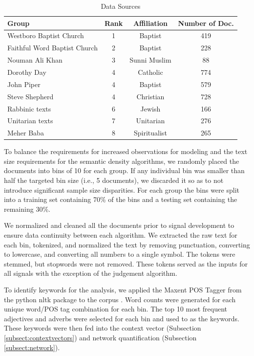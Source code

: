 \documentclass[11pt, a4paper]{article}
\begin{document}
\begin{table}[ht]
\caption{Data Sources}
\begin{center}
\begin{tabular}{lccc}
 \\  \hline
Group & Rank & Affiliation & Number of Doc.  \\ \hline
Westboro Baptist Church 		& 1 & Baptist		& 419 \\
Faithful Word Baptist Church	& 2 & Baptist		& 228 \\
Nouman Ali Khan			& 3 & Sunni Muslim	& 88 \\
Dorothy Day				& 4 & Catholic		& 774 \\
John Piper				& 4 & Baptist		& 579 \\
Steve Shepherd			& 4 & Christian		& 728 \\
Rabbinic texts				& 6 & Jewish		& 166 \\
Unitarian texts				& 7 & Unitarian		& 276 \\ 
Meher Baba				& 8 & Spiritualist	& 265 \\	

\end{tabular}
\end{center}
\label{table:data}
\end{table}

To balance the requirements for increased observations for modeling and the text size requirements for the semantic density algorithms, we randomly placed the documents into bins of 10 for each group. If any individual bin was smaller than half the targeted bin size (i.e., 5 documents), we discarded it so as to not introduce significant sample size disparities. For each group the bins were split into a training set containing 70\% of the bins and a testing set containing the remaining 30\%. 

We normalized and cleaned all the documents prior to signal development to ensure data continuity between each algorithm. We extracted the raw text for each bin, tokenized,  and normalized the text by removing punctuation, converting to lowercase, and converting all numbers to a single symbol. The tokens were stemmed, but stopwords were not removed. These tokens served as the inputs for all signals with the exception of the judgement algorithm.

To identify keywords for the analysis, we applied the Maxent POS Tagger from the python nltk package to the corpus \cite{loper2002}. Word counts were generated for each unique word/POS tag combination for each bin. The top 10 most frequent adjectives and adverbs were selected for each bin and used to as the keywords. These keywords were then fed into the context vector (Subsection \ref{subsect:contextvectors}) and network quantification (Subsection \ref{subsect:network}). 
\end{document}
